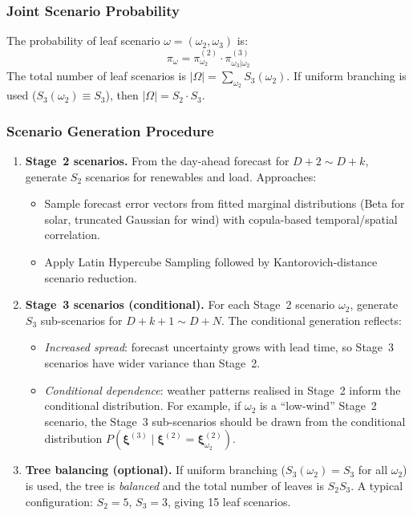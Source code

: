 \documentclass[11pt]{article}
\begin{document}
\subsubsection{Joint Scenario Probability}

The probability of leaf scenario $\omega = (\omega_2, \omega_3)$ is:
\begin{equation}\label{eq:pi-joint}
  \pi_\omega = \pi^{(2)}_{\omega_2} \cdot
  \pi^{(3)}_{\omega_3|\omega_2}
\end{equation}
The total number of leaf scenarios is
$|\Omega| = \sum_{\omega_2} S_3(\omega_2)$. If uniform branching is
used ($S_3(\omega_2) \equiv S_3$), then $|\Omega| = S_2 \cdot S_3$.

\subsubsection{Scenario Generation Procedure}

\begin{enumerate}
  \item \textbf{Stage~2 scenarios.} From the day-ahead forecast for
        $D{+}2 \sim D{+}k$, generate $S_2$ scenarios for renewables
        and load. Approaches:
        \begin{itemize}[nosep]
          \item Sample forecast error vectors from fitted marginal
                distributions (Beta for solar, truncated Gaussian for
                wind) with copula-based temporal/spatial correlation.
          \item Apply Latin Hypercube Sampling followed by
                Kantorovich-distance scenario reduction.
        \end{itemize}
  \item \textbf{Stage~3 scenarios (conditional).} For each Stage~2
        scenario $\omega_2$, generate $S_3$ sub-scenarios for
        $D{+}k{+}1 \sim D{+}N$. The conditional generation reflects:
        \begin{itemize}[nosep]
          \item \emph{Increased spread}: forecast uncertainty grows with
                lead time, so Stage~3 scenarios have wider variance than
                Stage~2.
          \item \emph{Conditional dependence}: weather patterns realised
                in Stage~2 inform the conditional distribution.
                For example, if $\omega_2$ is a ``low-wind'' Stage~2
                scenario, the Stage~3 sub-scenarios should be drawn from
                the conditional distribution
                $P(\boldsymbol{\xi}^{(3)} \mid \boldsymbol{\xi}^{(2)}
                = \boldsymbol{\xi}^{(2)}_{\omega_2})$.
        \end{itemize}
  \item \textbf{Tree balancing (optional).} If uniform branching
        ($S_3(\omega_2) = S_3$ for all $\omega_2$) is used, the tree is
        \emph{balanced} and the total number of leaves is $S_2 S_3$. A
        typical configuration: $S_2 = 5$, $S_3 = 3$, giving 15 leaf
        scenarios.
\end{enumerate}
\end{document}
